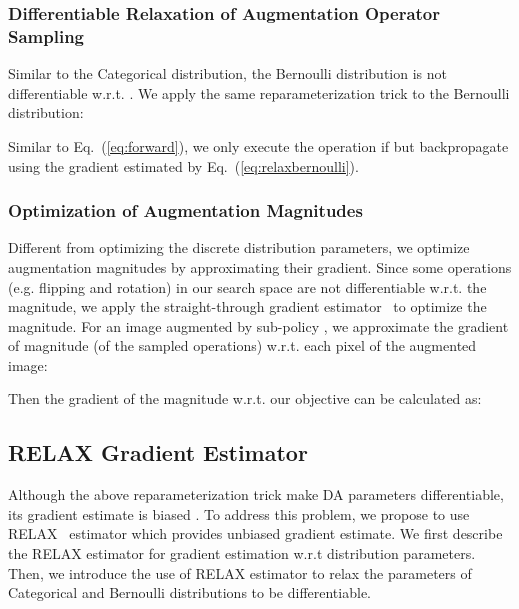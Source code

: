 \documentclass[runningheads]{llncs}
\begin{document}
\subsubsection{Differentiable Relaxation of Augmentation Operator Sampling}
Similar to the Categorical distribution, the Bernoulli distribution is not differentiable w.r.t. . We apply the same reparameterization trick to the Bernoulli distribution: 





Similar to Eq.~(\ref{eq:forward}), we only execute the 
operation if  but backpropagate using the gradient estimated by Eq.~(\ref{eq:relaxbernoulli}).

\subsubsection{Optimization of Augmentation Magnitudes}
Different from optimizing the discrete distribution parameters, we optimize augmentation magnitudes by approximating their gradient.
Since some operations (e.g. flipping and rotation) in our search space 
are not differentiable w.r.t. the magnitude, 
we apply the straight-through gradient estimator~\cite{DBLP:journals/corr/BengioLC13} to optimize the magnitude.
{For an image  augmented by sub-policy ,} we approximate the gradient of magnitude (of the sampled operations) w.r.t. each pixel of the augmented image: 

Then the gradient of the magnitude w.r.t. our objective  can be calculated as:









\subsection{RELAX Gradient Estimator}
\label{subsec:relax}
Although the above reparameterization trick make 
DA parameters
differentiable, its gradient estimate is biased \cite{DBLP:conf/iclr/JangGP17, DBLP:conf/iclr/MaddisonMT17}. To address this problem, we propose to use RELAX~\cite{DBLP:conf/iclr/GrathwohlCWRD18} estimator which provides unbiased gradient estimate. {We first describe the  RELAX estimator for  gradient estimation w.r.t distribution parameters.
Then, we introduce the use of RELAX estimator to relax the parameters of Categorical   and Bernoulli   distributions to be differentiable.}
\end{document}
